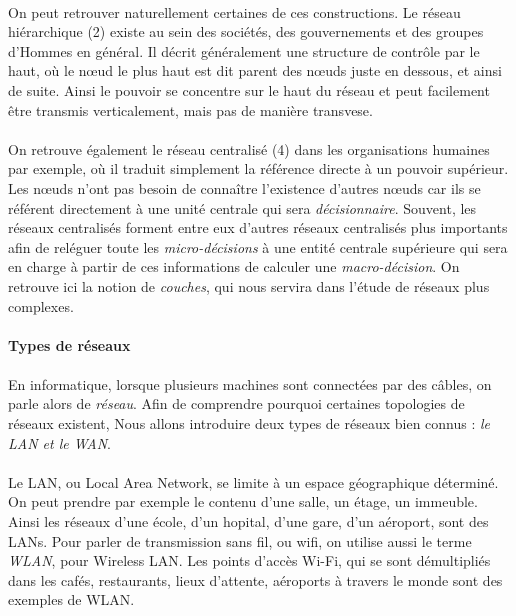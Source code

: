 \paragraph{} On peut retrouver naturellement certaines de ces constructions. Le réseau hiérarchique (2) existe
au sein des sociétés, des gouvernements et des groupes d'Hommes en général. Il décrit généralement une structure
de contrôle par le haut, où le n\oe{}ud le plus haut est dit parent des n\oe{}uds juste en dessous, et ainsi de suite.
Ainsi le pouvoir se concentre sur le haut du réseau et peut facilement être transmis verticalement, mais pas de 
manière transvese.

\paragraph{} On retrouve également le réseau centralisé (4) dans les organisations humaines par exemple,
où il traduit simplement la référence directe à un pouvoir supérieur. Les n\oe{}uds n'ont pas besoin de connaître
l'existence d'autres n\oe{}uds car ils se référent directement à une unité centrale qui sera \emph{décisionnaire}.
Souvent, les réseaux centralisés forment entre eux d'autres réseaux centralisés plus importants afin de reléguer
toute les \emph{micro-décisions} à une entité centrale supérieure qui sera en charge à partir de ces informations
de calculer une \emph{macro-décision}. On retrouve ici la notion de \emph{couches}, qui nous servira dans l'étude
de réseaux plus complexes.

\paragraph{Types de réseaux}

\paragraph{} En informatique, lorsque plusieurs machines sont connectées par des câbles, on
parle alors de \emph{réseau}. Afin de comprendre pourquoi certaines topologies de réseaux 
existent, Nous allons introduire deux types de réseaux bien connus : \emph{le LAN et le WAN}.

\paragraph{} Le LAN, ou Local Area Network, se limite à un espace géographique déterminé. On peut prendre
par exemple le contenu d'une salle, un étage, un immeuble. Ainsi les réseaux d'une école, d'un
hopital, d'une gare, d'un aéroport, sont des LANs. Pour parler de transmission sans fil, ou
wifi, on utilise aussi le terme \emph{WLAN}, pour Wireless LAN. Les points d'accès Wi-Fi, qui se
sont démultipliés dans les cafés, restaurants, lieux d'attente, aéroports à travers le monde
sont des exemples de WLAN.

